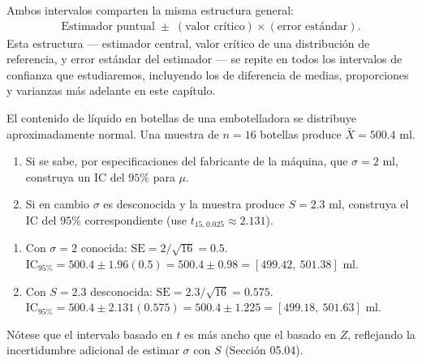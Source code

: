 \begin{observacion}
	Ambos intervalos comparten la misma estructura general:
	\begin{align}
		\text{Estimador puntual} \; \pm \; (\text{valor crítico}) \times (\text{error estándar}).
	\end{align}
	Esta estructura --- estimador central, valor crítico de una distribución de referencia, y error estándar del estimador --- se repite en todos los intervalos de confianza que estudiaremos, incluyendo los de diferencia de medias, proporciones y varianzas más adelante en este capítulo.
\end{observacion}

\begin{ejemplo}
	El contenido de líquido en botellas de una embotelladora se distribuye aproximadamente normal. Una muestra de $n=16$ botellas produce $\bar{X}=500.4$ ml.
	\begin{enumerate}
		\item Si se sabe, por especificaciones del fabricante de la máquina, que $\sigma=2$ ml, construya un IC del $95\%$ para $\mu$.
		\item Si en cambio $\sigma$ es desconocida y la muestra produce $S=2.3$ ml, construya el IC del $95\%$ correspondiente (use $t_{15,0.025}\approx 2.131$).
	\end{enumerate}
\end{ejemplo}

\begin{solucion}
	\begin{enumerate}
		\item Con $\sigma=2$ conocida: $\text{SE}=2/\sqrt{16}=0.5$. $\text{IC}_{95\%} = 500.4 \pm 1.96(0.5) = 500.4 \pm 0.98 = [499.42,\ 501.38]$ ml.
		\item Con $S=2.3$ desconocida: $\text{SE}=2.3/\sqrt{16}=0.575$. $\text{IC}_{95\%} = 500.4 \pm 2.131(0.575) = 500.4 \pm 1.225 = [499.18,\ 501.63]$ ml.
	\end{enumerate}
	Nótese que el intervalo basado en $t$ es más ancho que el basado en $Z$, reflejando la incertidumbre adicional de estimar $\sigma$ con $S$ (Sección 05.04).
\end{solucion}

